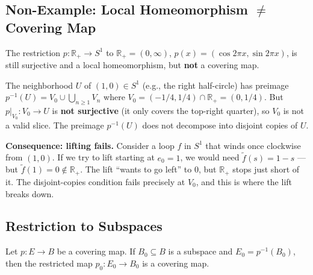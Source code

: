 \documentclass[11pt]{report}
\begin{document}
\subsection{Non-Example: Local Homeomorphism $\neq$ Covering Map}

\begin{exbox}
The restriction $p: \mathbb{R}_+ \to S^1$ to $\mathbb{R}_+ = (0, \infty)$, $p(x) = (\cos 2\pi x, \sin 2\pi x)$, is still surjective and a local homeomorphism, but \textbf{not} a covering map.

The neighborhood $U$ of $(1, 0) \in S^1$ (e.g., the right half-circle) has preimage $p^{-1}(U) = V_0 \cup \bigcup_{n \geq 1} V_n$ where $V_0 = (-1/4, 1/4) \cap \mathbb{R}_+ = (0, 1/4)$. But $p|_{V_0}: V_0 \to U$ is \textbf{not surjective} (it only covers the top-right quarter), so $V_0$ is not a valid slice. The preimage $p^{-1}(U)$ does not decompose into disjoint copies of $U$.

\textbf{Consequence: lifting fails.} Consider a loop $f$ in $S^1$ that winds once clockwise from $(1,0)$. If we try to lift starting at $e_0 = 1$, we would need $\tilde{f}(s) = 1 - s$ --- but $\tilde{f}(1) = 0 \notin \mathbb{R}_+$. The lift ``wants to go left'' to $0$, but $\mathbb{R}_+$ stops just short of it. The disjoint-copies condition fails precisely at $V_0$, and this is where the lift breaks down.
\end{exbox}

\subsection{Restriction to Subspaces}

\begin{thmbox}
Let $p: E \to B$ be a covering map. If $B_0 \subseteq B$ is a subspace and $E_0 = p^{-1}(B_0)$, then the restricted map $p_0: E_0 \to B_0$ is a covering map.
\end{thmbox}
\end{document}
